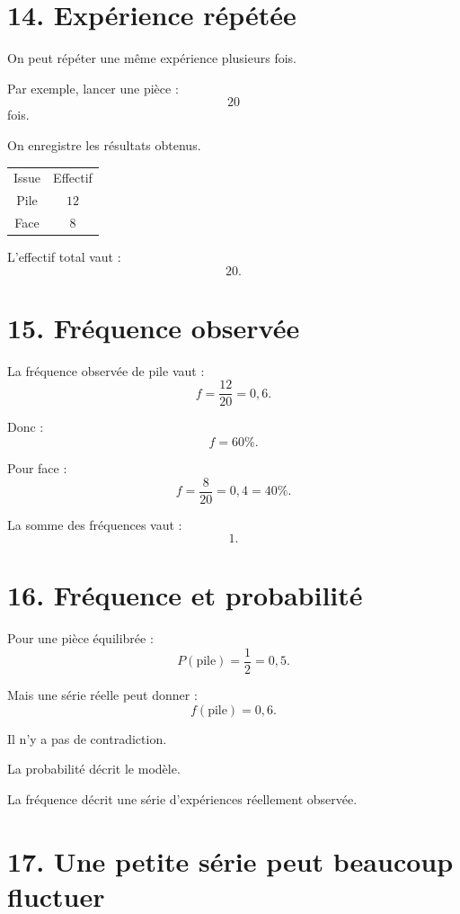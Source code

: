 \section{14. Expérience répétée}

On peut répéter une même expérience plusieurs fois.

Par exemple, lancer une pièce :
\[
20
\]
fois.

On enregistre les résultats obtenus.

\begin{tabular}{c|c}
Issue & Effectif \\
Pile & $12$ \\
Face & $8$ \\
\end{tabular}

L'effectif total vaut :
\[
20.
\]

\section{15. Fréquence observée}

La fréquence observée de pile vaut :
\[
f=\dfrac{12}{20}=0{,}6.
\]

Donc :
\[
f=60\%.
\]

Pour face :
\[
f=\dfrac8{20}=0{,}4=40\%.
\]

La somme des fréquences vaut :
\[
1.
\]

\section{16. Fréquence et probabilité}

Pour une pièce équilibrée :
\[
P(\text{pile})=\dfrac12=0{,}5.
\]

Mais une série réelle peut donner :
\[
f(\text{pile})=0{,}6.
\]

Il n'y a pas de contradiction.

La probabilité décrit le modèle.

La fréquence décrit une série d'expériences réellement observée.


\section{17. Une petite série peut beaucoup fluctuer}

